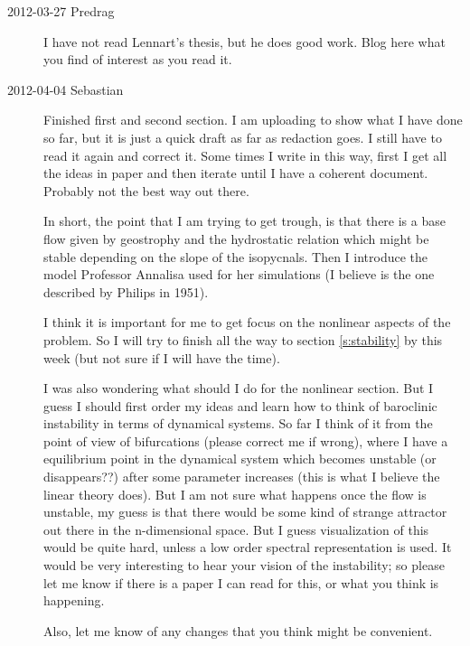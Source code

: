 \begin{description}
\item[2012-03-27 Predrag] I have not read Lennart's thesis, but he does good work. Blog
here what you find of interest as you read it.

\item[2012-04-04 Sebastian]
Finished first and second section. I am uploading to show what I have done so far, but it is just a quick draft as far as redaction goes. I still have to read it again and correct it. Some times I write in this way, first I get all the ideas in paper and then iterate until I have a coherent document. Probably not the best way out there. 

In short, the point that I am trying to get trough, is that there is a base flow given by geostrophy and the hydrostatic relation which might be stable depending on the slope of the isopycnals. Then I introduce the model Professor Annalisa used for her simulations (I believe is the one described by Philips in 1951).

I think it is important for me to get focus on the nonlinear aspects of the problem. So I will try to finish all the way to section \ref{s:stability} by this week (but not sure if I will have the time). 

I was also wondering what should I do for the nonlinear section. But I guess I should first order my ideas and learn how to think of baroclinic instability in terms of dynamical systems. So far I think of it from the point of view of bifurcations (please correct me if wrong), where I have a equilibrium point in the dynamical system which becomes unstable (or disappears??) after some parameter increases (this is what I believe the linear theory does). But I am not sure what happens once the flow is unstable, my guess is that there would be some kind of strange attractor out there in the n-dimensional space. But I guess visualization of this would be quite hard, unless a low order spectral representation is used. It would be very interesting to hear your vision of the instability; so please let me know if there is a paper I can read for this, or what you think is happening.

Also, let me know of any changes that you think might be convenient. 
\end{description}
